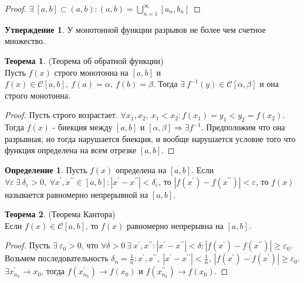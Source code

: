 \documentclass[a4paper, 12pt]{article}
\renewcommand{\epsilon}{\varepsilon}
\theoremstyle{definition}
\newtheorem*{definition}{Определение}
\newtheorem*{theorem}{Теорема}
\newtheorem*{statement}{Утверждение}
\begin{document}
        \begin{proof}
            $\exists\ [a,b]\subset (a,b): (a,b)=\bigcup\limits_{n=1}^{\infty}[a_n,b_n]$
        \end{proof}
        \begin{statement}
            У монотонной функции разрывов не более чем счетное множество.
        \end{statement} 
        \begin{theorem} (Теорема об обратной функции)\\
            Пусть $f(x)$ строго монотонна на $[a,b]$ и $f(x)\in\mathcal{C}[a,b],\ f(a)=\alpha,\ f(b)=\beta$. Тогда $\exists\ f^{-1}(y)\in\mathcal{C}[\alpha,\beta]$ и она строго монотонна. 
        \end{theorem} 
        \begin{proof}
            Пусть строго возрастает. $\forall x_1,x_2,\ x_1<x_2: f(x_1)=y_1<y_2=f(x_2)$. Тогда $f(x)$ - биекция между $[a,b]$ и $[\alpha,\beta] \Rightarrow \exists f^{-1}$. Предположим что она разрывная, но тогда нарушается биекция, и вообще нарушается условие того что функция определена на всем отрезке $[a,b]$.
        \end{proof} 
        \begin{definition}
            Пусть $f(x)$ определена на $[a,b]$. Если $\forall \epsilon\ \exists\ \delta_{\epsilon}>0,\ \forall x^{\prime}, x^{\prime\prime}\in [a,b]: |x^{\prime}-x^{\prime\prime}|<\delta_{\epsilon}$, то $|f(x^{\prime})-f(x^{\prime\prime})|<\epsilon$, то $f(x)$ называется равномерно непрерывной на $[a,b]$.
        \end{definition} 
        \begin{theorem} (Теорема Кантора)\\
            Если $f(x)\in \mathcal{C}[a,b]$, то $f(x)$ равномерно непрерывна на $[a,b]$.
        \end{theorem} 
        \begin{proof}
            Пусть $\exists\ \epsilon_0>0$, что $\forall \delta>0\ \exists\ x^{\prime}, x^{\prime\prime}: |x^{\prime}-x^{\prime\prime}|<\delta: |f(x^{\prime})-f(x^{\prime\prime})|\geq \epsilon_0$. Возьмем последовательность $\delta_n=\frac{1}{n}: x^{\prime},x^{\prime\prime},\ |x^{\prime}-x^{\prime\prime}|<\frac{1}{n},\ |f(x^{\prime})-f(x^{\prime})|\geq \epsilon_0$. $\exists x_{n_k}^{\prime}\to x_0$, тогда $f(x_{n_k}^{\prime})\to f(x_0)$ и $f(x_{n_k}^{\prime\prime})\to f(x_0)$.
        \end{proof}
\end{document}
